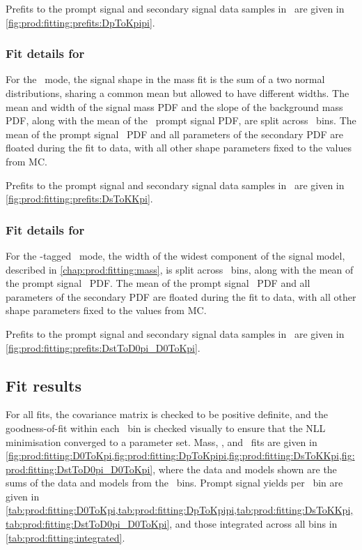 Prefits to the prompt signal and secondary signal data samples in \lnipchisq\ 
are given in \cref{fig:prod:fitting:prefits:DpToKpipi}.

\subsubsection*{Fit details for \PDsplus}
\label{chap:prod:fitting:details:DsToKKpi}

For the \DspTophipi\ mode, the signal shape in the mass fit is the sum of a two 
normal distributions, sharing a common mean but allowed to have different 
widths.
The mean and width of the signal mass \ac{PDF} and the slope of the background 
mass \ac{PDF}, along with the mean of the \lnipchisq\ prompt signal \ac{PDF}, 
are split across \pTy\ bins.
The mean of the prompt signal \lnipchisq\ \ac{PDF} and all parameters of the 
secondary \ac{PDF} are floated during the fit to data, with all other shape 
parameters fixed to the values from \ac{MC}.

Prefits to the prompt signal and secondary signal data samples in \lnipchisq\ 
are given in \cref{fig:prod:fitting:prefits:DsToKKpi}.

\subsubsection*{Fit details for \PDstarp}
\label{chap:prod:fitting:details:DstToD0pi}

For the \PDstarp-tagged \DzToKpi\ mode, the width of the widest component of 
the signal model, described in \cref{chap:prod:fitting:mass}, is split across 
\pTy\ bins, along with the mean of the prompt signal \lnipchisq\ \ac{PDF}.
The mean of the prompt signal \lnipchisq\ \ac{PDF} and all parameters of the 
secondary \ac{PDF} are floated during the fit to data, with all other shape 
parameters fixed to the values from \ac{MC}.

Prefits to the prompt signal and secondary signal data samples in \PDzero 
\lnipchisq\ are given in \cref{fig:prod:fitting:prefits:DstToD0pi_D0ToKpi}.

\subsection{Fit results}
\label{chap:prod:fitting:results}

For all fits, the covariance matrix is checked to be positive definite, and the 
goodness-of-fit within each \pTy\ bin is checked visually to ensure that the 
\ac{NLL} minimisation converged to a parameter set.
Mass, \deltam, and \lnipchisq\ fits are given in 
\cref{fig:prod:fitting:D0ToKpi,fig:prod:fitting:DpToKpipi,fig:prod:fitting:DsToKKpi,fig:prod:fitting:DstToD0pi_D0ToKpi}, 
where the data and models shown are the sums of the data and models from the 
\pTy\ bins.
Prompt signal yields per \pTy\ bin are given in 
\cref{tab:prod:fitting:D0ToKpi,tab:prod:fitting:DpToKpipi,tab:prod:fitting:DsToKKpi,tab:prod:fitting:DstToD0pi_D0ToKpi}, 
and those integrated across all bins in \cref{tab:prod:fitting:integrated}.

